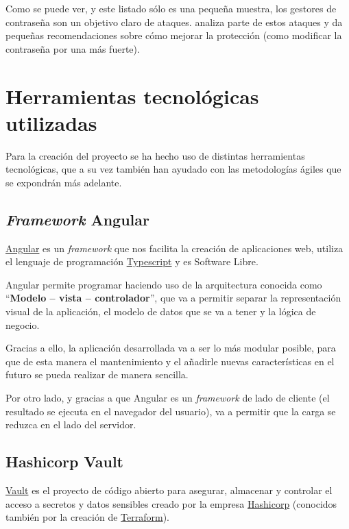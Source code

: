 \documentclass{\ClassPath/viu-tfm-template}
\begin{document}
Como se puede ver, y este listado sólo es una pequeña muestra, los gestores de contraseña son un objetivo claro de ataques.  \textcite{hacked3} analiza parte de estos ataques y da pequeñas recomendaciones sobre cómo mejorar la protección (como modificar la contraseña por una más fuerte).


\section{Herramientas tecnológicas utilizadas}

Para la creación del proyecto se ha hecho uso de distintas herramientas tecnológicas, que a su vez también han ayudado con las metodologías ágiles que se expondrán más adelante.


\subsection{\textit{Framework} Angular}

\href{https://angular.io/}{Angular} es un \textit{framework} que nos facilita la creación de aplicaciones web, utiliza el lenguaje de programación \href{https://www.typescriptlang.org/}{Typescript} y es Software Libre.

Angular permite programar haciendo uso de la arquitectura conocida como “\textbf{Modelo – vista – controlador}”, que  va a permitir separar la representación visual de la aplicación, el modelo de datos que se va a tener y la lógica de negocio.

Gracias a ello, la aplicación desarrollada va a ser lo más modular posible, para que de esta manera el mantenimiento y el añadirle nuevas características en el futuro se pueda realizar de manera sencilla.

Por otro lado, y gracias a que Angular es un \textit{framework} de lado de cliente (el resultado se ejecuta en el navegador del usuario), va a permitir que la carga se reduzca en el lado del servidor.

\subsection{Hashicorp Vault}

\href{https://www.vaultproject.io/}{Vault} es el proyecto de código abierto para asegurar, almacenar y controlar el acceso a secretos y datos sensibles creado por la empresa \href{https://www.hashicorp.com/}{Hashicorp} (conocidos también por la creación de \href{https://www.terraform.io/}{Terraform}).
\end{document}
